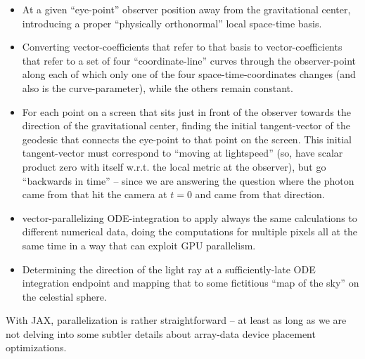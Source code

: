 \documentclass[twocolumn]{article}
\begin{document}
\begin{itemize}
  \item At a given ``eye-point'' observer position away from the
    gravitational center, introducing a proper ``physically
    orthonormal'' local space-time basis.
  \item Converting vector-coefficients that refer to that basis to
    vector-coefficients that refer to a set of four
    ``coordinate-line'' curves through the observer-point along each
    of which only one of the four space-time-coordinates changes (and
    also is the curve-parameter), while the others remain constant.
  \item For each point on a screen that sits just in front of the
    observer towards the direction of the gravitational center,
    finding the initial tangent-vector of the geodesic that connects
    the eye-point to that point on the screen. This initial
    tangent-vector must correspond to ``moving at lightspeed'' (so,
    have scalar product zero with itself w.r.t. the local metric at
    the observer), but go ``backwards in time'' -- since we are
    answering the question where the photon came from that hit the
    camera at $t=0$ and came from that direction.
  \item vector-parallelizing ODE-integration to apply always the same
    calculations to different numerical data, doing the computations
    for multiple pixels all at the same time in a way that can exploit
    GPU parallelism.
  \item Determining the direction of the light ray at a
    sufficiently-late ODE integration endpoint and mapping that to
    some fictitious ``map of the sky'' on the celestial sphere.
\end{itemize}

With JAX, parallelization is rather straightforward -- at least as
long as we are not delving into some subtler details about array-data
device placement optimizations.
\end{document}
